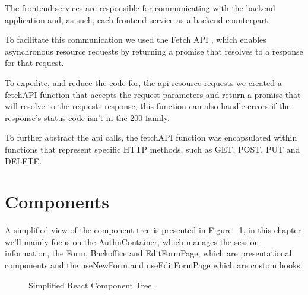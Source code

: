 The frontend services are responsible for communicating with the backend application and, as such, each frontend service as a backend counterpart.

To facilitate this communication we used the Fetch API \cite{Fetch_API}, which enables asynchronous resource requests by returning a promise that resolves to a response for that request.

To expedite, and reduce the code for, the api resource requests we created a fetchAPI function that accepts the request parameters and return a promise that will resolve to the requests response, this function can also handle errors if the response's status code isn't in the 200 family.

To further abstract the api calls,  the fetchAPI function was encapsulated within functions that represent specific HTTP methods, such as GET, POST, PUT and DELETE.

\section{Components}

A simplified view of the component tree is presented in Figure ~\ref{fig:reactComponentTree}, in this chapter we'll mainly focus on the AuthnContainer, which manages the session information, the Form, Backoffice and EditFormPage, which are presentational components and the useNewForm and useEditFormPage which are custom hooks.

\begin{figure}[H]
	\begin{center}
	\end{center}
	\caption{Simplified React Component Tree.}\label{fig:reactComponentTree}
\end{figure}

